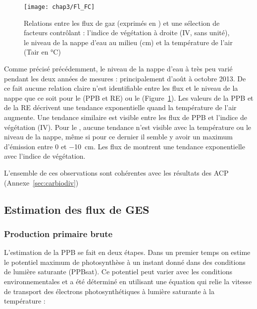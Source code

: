 \begin{figure}[!htb]
\centering
\texttt{[image: chap3/Fl\_FC]}
\caption{Relations entre les flux de gaz (exprimés en \si{\uml}) et une sélection de facteurs contrôlant : l'indice de végétation à droite (IV, sans unité), le niveau de la nappe d'eau au milieu (cm) et la température de l'air (Tair en \si{\degreeCelsius})}
\label{fig:Fl_FC}
\end{figure}

Comme précisé précédemment, le niveau de la nappe d'eau à très peu varié pendant les deux années de mesures : principalement d'août à octobre 2013.
De ce fait aucune relation claire n'est identifiable entre les flux et le niveau de la nappe que ce soit pour le \coo (PPB et RE) ou le \chh (Figure~\ref{fig:Fl_FC}).
Les valeurs de la PPB et de la RE décrivent une tendance exponentielle quand la température de l'air augmente.
Une tendance similaire est visible entre les flux de PPB et l'indice de végétation (IV).
Pour le \chh, aucune tendance n'est visible avec la température ou le niveau de la nappe, même si pour ce dernier il semble y avoir un maximum d'émission entre 0 et \SI{-10}{\centi\metre}.
Les flux de \chh montrent une tendance exponentielle avec l'indice de végétation.

L'ensemble de ces observations sont cohérentes avec les résultats des ACP (Annexe~\ref{sec:carbiodiv})

\subsection{Estimation des flux de GES}

\subsubsection{Production primaire brute}


L'estimation de la PPB se fait en deux étapes.
Dans un premier temps on estime le potentiel maximum de photosynthèse à un instant donné dans des conditions de lumière saturante (PPBsat).
Ce potentiel peut varier avec les conditions environnementales et a été déterminé en utilisant une équation qui relie la vitesse de transport des électrons photosynthétiques à lumière saturante à la température \citep{june2004} :

